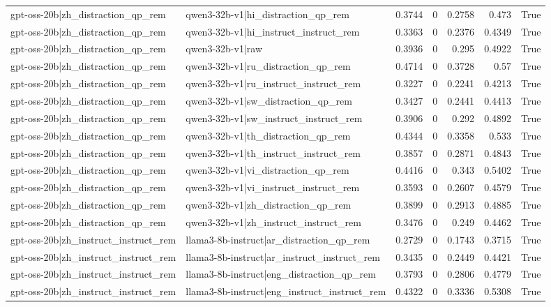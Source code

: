 \begin{table}
\begin{tabular}{l l r r r r l}
gpt-oss-20b|zh_distraction_qp_rem & qwen3-32b-v1|hi_distraction_qp_rem & 0.3744 & 0 & 0.2758 & 0.473 & True \\
gpt-oss-20b|zh_distraction_qp_rem & qwen3-32b-v1|hi_instruct_instruct_rem & 0.3363 & 0 & 0.2376 & 0.4349 & True \\
gpt-oss-20b|zh_distraction_qp_rem & qwen3-32b-v1|raw & 0.3936 & 0 & 0.295 & 0.4922 & True \\
gpt-oss-20b|zh_distraction_qp_rem & qwen3-32b-v1|ru_distraction_qp_rem & 0.4714 & 0 & 0.3728 & 0.57 & True \\
gpt-oss-20b|zh_distraction_qp_rem & qwen3-32b-v1|ru_instruct_instruct_rem & 0.3227 & 0 & 0.2241 & 0.4213 & True \\
gpt-oss-20b|zh_distraction_qp_rem & qwen3-32b-v1|sw_distraction_qp_rem & 0.3427 & 0 & 0.2441 & 0.4413 & True \\
gpt-oss-20b|zh_distraction_qp_rem & qwen3-32b-v1|sw_instruct_instruct_rem & 0.3906 & 0 & 0.292 & 0.4892 & True \\
gpt-oss-20b|zh_distraction_qp_rem & qwen3-32b-v1|th_distraction_qp_rem & 0.4344 & 0 & 0.3358 & 0.533 & True \\
gpt-oss-20b|zh_distraction_qp_rem & qwen3-32b-v1|th_instruct_instruct_rem & 0.3857 & 0 & 0.2871 & 0.4843 & True \\
gpt-oss-20b|zh_distraction_qp_rem & qwen3-32b-v1|vi_distraction_qp_rem & 0.4416 & 0 & 0.343 & 0.5402 & True \\
gpt-oss-20b|zh_distraction_qp_rem & qwen3-32b-v1|vi_instruct_instruct_rem & 0.3593 & 0 & 0.2607 & 0.4579 & True \\
gpt-oss-20b|zh_distraction_qp_rem & qwen3-32b-v1|zh_distraction_qp_rem & 0.3899 & 0 & 0.2913 & 0.4885 & True \\
gpt-oss-20b|zh_distraction_qp_rem & qwen3-32b-v1|zh_instruct_instruct_rem & 0.3476 & 0 & 0.249 & 0.4462 & True \\
gpt-oss-20b|zh_instruct_instruct_rem & llama3-8b-instruct|ar_distraction_qp_rem & 0.2729 & 0 & 0.1743 & 0.3715 & True \\
gpt-oss-20b|zh_instruct_instruct_rem & llama3-8b-instruct|ar_instruct_instruct_rem & 0.3435 & 0 & 0.2449 & 0.4421 & True \\
gpt-oss-20b|zh_instruct_instruct_rem & llama3-8b-instruct|eng_distraction_qp_rem & 0.3793 & 0 & 0.2806 & 0.4779 & True \\
gpt-oss-20b|zh_instruct_instruct_rem & llama3-8b-instruct|eng_instruct_instruct_rem & 0.4322 & 0 & 0.3336 & 0.5308 & True \\

\end{tabular}
\end{table}
